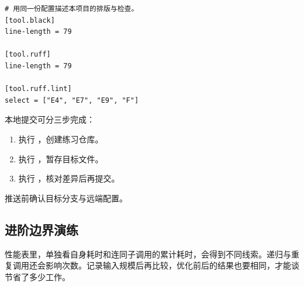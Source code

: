 \begin{lstlisting}[language={},title={\code{pyproject.toml}}]
# 用同一份配置描述本项目的排版与检查。
[tool.black]
line-length = 79

[tool.ruff]
line-length = 79

[tool.ruff.lint]
select = ["E4", "E7", "E9", "F"]
\end{lstlisting}
本地提交可分三步完成：
\begin{enumerate}
  \item 执行 ，创建练习仓库。
  \item 执行 ，暂存目标文件。
  \item 执行 ，核对差异后再提交。
\end{enumerate}
推送前确认目标分支与远端配置。

\subsection*{进阶边界演练}
性能表里，单独看自身耗时和连同子调用的累计耗时，会得到不同线索。递归与重复调用还会影响次数。记录输入规模后再比较，优化前后的结果也要相同，才能谈节省了多少工作。

